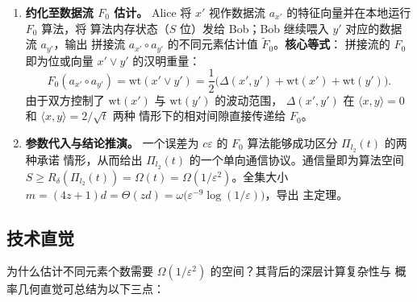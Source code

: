 \documentclass[UTF8, 11pt, a4paper, linestretch=1.15]{ctexart}
\theoremstyle{zhstyle}
\newcommand{\eps}{\varepsilon}
\newcommand{\Fzero}{F_0}
\newcommand{\inner}[2]{\langle #1, #2 \rangle}
\begin{document}
\begin{enumerate}
		经拼接后的长比特串 $x', y' \in \{0, 1\}^m$ 满足：汉明距离严格对应 $\ell_1$
		距离，
		$\Delta(x', y') = \big|s(\psi(\phi(x))) - s(\psi(\phi(y)))\big|$；
		汉明重量严格对应 $\ell_1$ 范数，
		$\mathrm{wt}(x') = \big|s(\psi(\phi(x)))\big|$。
		\item \textbf{约化至数据流 $\Fzero$ 估计。}
		Alice 将 $x'$ 视作数据流 $a_{x'}$ 的特征向量并在本地运行 $\Fzero$ 算法，将
		算法内存状态（$S$ 位）发给 Bob；Bob 继续喂入 $y'$ 对应的数据流 $a_{y'}$，输出
		拼接流 $a_{x'} \circ a_{y'}$ 的不同元素估计值 $\tilde{F}_0$。\textbf{核心等式}：
		拼接流的 $\Fzero$ 即为位或向量 $x' \lor y'$ 的汉明重量：
		\[
		\Fzero(a_{x'} \circ a_{y'}) = \mathrm{wt}(x' \lor y')
		= \frac{1}{2}\big(\Delta(x', y') + \mathrm{wt}(x') + \mathrm{wt}(y')\big).
		\]
		由于双方控制了 $\mathrm{wt}(x')$ 与 $\mathrm{wt}(y')$ 的波动范围，
		$\Delta(x', y')$ 在 $\inner{x}{y} = 0$ 和 $\inner{x}{y} = 2/\sqrt{t}$ 两种
		情形下的相对间隙直接传递给 $\Fzero$。
		\item \textbf{参数代入与结论推演。}
		一个误差为 $c\eps$ 的 $\Fzero$ 算法能够成功区分 $\Pi_{l_2}(t)$ 的两种承诺
		情形，从而给出 $\Pi_{l_2}(t)$ 的一个单向通信协议。通信量即为算法空间
		$S \geq R_\delta(\Pi_{l_2}(t)) = \Omega(t) = \Omega(1/\eps^2)$。全集大小
		$m = (4z+1)d = \Theta(zd) = \omega\big(\eps^{-9} \log(1/\eps)\big)$，导出
		主定理。
	\end{enumerate}
	
	\subsection{技术直觉}
	
	为什么估计不同元素个数需要 $\Omega(1/\eps^2)$ 的空间？其背后的深层计算复杂性与
	概率几何直觉可总结为以下三点：
	
\end{document}

